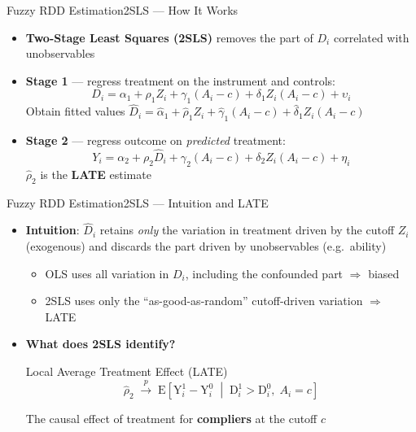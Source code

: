 \documentclass[hyperref={pdfpagelabels=false}]{beamer}
\begin{document}
\begin{frame}{Fuzzy RDD Estimation}{2SLS --- How It Works}
	\begin{itemize}
		\item \textbf{Two-Stage Least Squares (2SLS)} removes the part of $D_i$ correlated with unobservables
		\vspace{0.15cm}
		\item \textbf{Stage 1} --- regress treatment on the instrument and controls:
		\begin{equation*}
			D_i = \alpha_1 + \rho_1 Z_i + \gamma_1(A_i-c) + \delta_1 Z_i(A_i-c) + \upsilon_i
		\end{equation*}
		Obtain fitted values $\hat{D}_i = \hat{\alpha}_1 + \hat{\rho}_1 Z_i + \hat{\gamma}_1(A_i-c) + \hat{\delta}_1 Z_i(A_i-c)$
		\vspace{0.15cm}
		\item \textbf{Stage 2} --- regress outcome on \emph{predicted} treatment:
		\begin{equation*}
			Y_i = \alpha_2 + \rho_2 \hat{D}_i + \gamma_2(A_i-c) + \delta_2 Z_i(A_i-c) + \eta_i
		\end{equation*}
		$\hat{\rho}_2$ is the \textbf{LATE} estimate
	\end{itemize}
\end{frame}


\begin{frame}{Fuzzy RDD Estimation}{2SLS --- Intuition and LATE}
	\begin{itemize}
		\item \textbf{Intuition}: $\hat{D}_i$ retains \emph{only} the variation in treatment driven by the cutoff $Z_i$ (exogenous) and discards the part driven by unobservables (e.g.\ ability)
		\vspace{0.2cm}
		\begin{itemize}
			\item OLS uses all variation in $D_i$, including the confounded part $\Rightarrow$ biased
			\vspace{0.1cm}
			\item 2SLS uses only the ``as-good-as-random'' cutoff-driven variation $\Rightarrow$ LATE
		\end{itemize}
		\vspace{0.3cm}
		\item \textbf{What does 2SLS identify?}
		\begin{block}{Local Average Treatment Effect (LATE)}
			\begin{equation*}
				\hat{\rho}_2 \;\xrightarrow{p}\; \mathrm{E}\!\left[\mathrm{Y}^1_i - \mathrm{Y}^0_i \;\middle|\; \mathrm{D}^1_i > \mathrm{D}^0_i,\; A_i = c\right]
			\end{equation*}
		\end{block}
		The causal effect of treatment for \textbf{compliers} at the cutoff $c$
	\end{itemize}
\end{frame}
\end{document}
